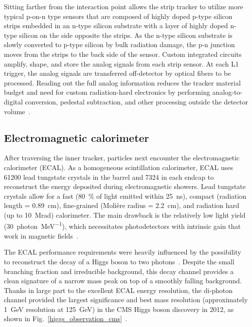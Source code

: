 Sitting farther from the interaction point allows the strip tracker to utilize more typical p-on-n type sensors that are composed of highly doped p-type silicon strips embedded in an n-type silicon substrate with a layer of highly doped n-type silicon on the side opposite the strips. As the n-type silicon substrate is slowly converted to p-type silicon by bulk radiation damage, the p-n junction moves from the strips to the back side of the sensor. Custom integrated circuits amplify, shape, and store the analog signals from each strip sensor. At each L1 trigger, the analog signals are transferred off-detector by optical fibers to be processed. Reading out the full analog information reduces the tracker material budget and need for custom radiation-hard electronics by performing analog-to-digital conversion, pedestal subtraction, and other processing outside the detector volume~\cite{cms_experiment}.



\subsection{Electromagnetic calorimeter}
After traversing the inner tracker, particles next encounter the electromagnetic calorimeter (ECAL). As a homogeneous scintillation calorimeter, ECAL uses \num{61200} lead tungstate crystals in the barrel and \num{7324} in each endcap to reconstruct the energy deposited during electromagnetic showers. Lead tungstate crystals allow for a fast (\SI{80}{\percent} of light emitted within \SI{25}{\ns}), compact (radiation length = \SI{0.89}{cm}), fine-grained (Moli\`ere radius = \SI{2.2}{\cm}), and radiation hard (up to \SI{10}{\mega rad}) calorimeter. The main drawback is the relatively low light yield (\SI{30}{photon\per\mega\electronvolt}), which necessitates photodetectors with intrinsic gain that work in magnetic fields~\cite{cms_experiment, cms_tdr_v1}.

The ECAL performance requirements were heavily influenced by the possibility to reconstruct the decay of a Higgs boson to two photons~\cite{cms_tdr_v2}. Despite the small branching fraction and irreducible background, this decay channel provides a clean signature of a narrow mass peak on top of a smoothly falling background. Thanks in large part to the excellent ECAL energy resolution, the di-photon channel provided the largest significance and best mass resolution (approximately \SI{1}{\GeV} resolution at \SI{125}{\GeV}) in the CMS Higgs boson discovery in 2012, as shown in Fig.~\ref{higgs_observation_cms}~\cite{cms_higgs}.

